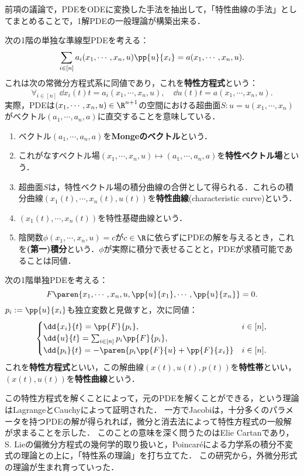 \documentclass[uplatex,dvipdfmx]{jsreport}
\begin{document}
\begin{tcolorbox}[colframe=ForestGreen, colback=ForestGreen!10!white,breakable,colbacktitle=ForestGreen!40!white,coltitle=black,fonttitle=\bfseries\sffamily,
title=]
    前項の議論で，PDEをODEに変換した手法を抽出して，「特性曲線の手法」としてまとめることで，1解PDEの一般理論が構築出来る．
\end{tcolorbox}

\begin{definition}
    次の1階の単独な準線型PDEを考える：
    \[\sum_{i\in[n]}a_i(x_1,\cdots,x_n,u)\pp{u}{x_i}=a(x_1,\cdots,x_n,u).\]
    これは次の常微分方程式系に同値であり，これを\textbf{特性方程式}という：
    \[\forall_{i\in[n]}\;\dd{x_i(t)}{t}=a_i(x_1,\cdots,x_n,u),\quad \dd{u(t)}{t}=a(x_1,\cdots,x_n,u).\]
    実際，PDEは$(x_1,\cdots,x_n,u)\in\R^{n+1}$の空間における超曲面$S:u=u(x_1,\cdots,x_n)$がベクトル$(a_1,\cdots,a_n,a)$に直交することを意味している．
    \begin{enumerate}
        \item ベクトル$(a_1,\cdots,a_n,a)$を\textbf{Mongeのベクトル}という．
        \item これがなすベクトル場$(x_1,\cdots,x_n,u)\mapsto(a_1,\cdots,a_n,a)$を\textbf{特性ベクトル場}という．
        \item 超曲面$S$は，特性ベクトル場の積分曲線の合併として得られる．これらの積分曲線$(x_1(t),\cdots,x_n(t),u(t))$を\textbf{特性曲線}(characteristic curve)という．
        \item $(x_1(t),\cdots,x_n(t))$を特性基礎曲線という．
        \item 陰関数$\phi(x_1,\cdots,x_n,u)=c$が$c\in\R$に依らずにPDEの解を与えるとき，これを\textbf{(第一)積分}という．$\phi$が実際に積分で表せることと，PDEが求積可能であることは同値．
    \end{enumerate}
\end{definition}

\begin{definition}
    次の1階単独PDEを考える：
    \[F\paren{x_1,\cdots,x_n,u,\pp{u}{x_1},\cdots,\pp{u}{x_n}}=0.\]
    $p_i:=\pp{u}{x_i}$も独立変数と見做すと，次に同値：
    \[\begin{cases}
        \dd{x_i}{t}=\pp{F}{p_i},&i\in[n],\\
        \dd{u}{t}=\sum_{i\in[n]}p_i\pp{F}{p_i},\\
        \dd{p_i}{t}=-\paren{p_i\pp{F}{u}+\pp{F}{x_i}}&i\in[n].
    \end{cases}\]
    これを\textbf{特性方程式}といい，この解曲線$(x(t),u(t),p(t))$を\textbf{特性帯}といい，$(x(t),u(t))$を\textbf{特性曲線}という．
\end{definition}
\begin{history}
    この特性方程式を解くことによって，元のPDEを解くことができる，という理論はLagrangeとCauchyによって証明された．
    一方でJacobiは，十分多くのパラメータを持つPDEの解が得られれば，微分と消去法によって特性方程式の一般解が求まることを示した．
    このことの意味を深く問うたのはElie Cartanであり，S. Lieの偏微分方程式の幾何学的取り扱いと，Poincaréによる力学系の積分不変式の理論との上に，「特性系の理論」を打ち立てた．
    この研究から，外微分形式の理論が生まれ育っていった．
\end{history}
\end{document}
